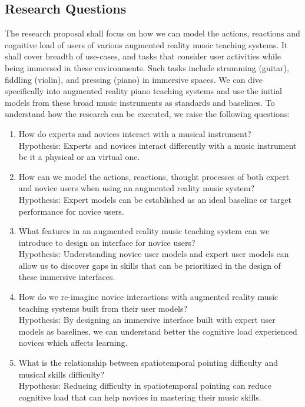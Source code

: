 \documentclass{article}
\begin{document}
\subsection{Research Questions}
The research proposal shall focus on how we can model the actions, reactions and cognitive load of users of various augmented reality music teaching systems. It shall cover breadth of use-cases, and tasks that consider user activities while being immersed in these environments. Such tasks include strumming (guitar), fiddling (violin), and pressing (piano) in immersive spaces. We can dive specifically into augmented reality piano teaching systems  and use the initial models from these broad music instruments as standards and baselines. To understand how the research can be executed, we raise the following questions: 
\begin{enumerate}
    \item How do experts and novices interact with a musical instrument?\\
    Hypothesis: Experts and novices interact differently with a music instrument be it a physical or an virtual one. 
    \item How can we model the actions, reactions, thought processes of both expert and novice users when using an augmented reality music system?\\
    Hypothesis: Expert models can be established as an ideal baseline or target performance for novice users. 
    \item What features in an augmented reality music teaching system can we introduce to design an interface for novice users?\\
    Hypothesis: Understanding novice user models and expert user models can allow us to discover gaps in skills that can be prioritized in the design of these immersive interfaces. 
    \item How do we re-imagine novice interactions with augmented reality music teaching systems built from their user models?\\
    Hypothesis: By designing an immersive interface built with expert user models as baselines, we can understand better the cognitive load experienced novices which affects learning. 
    \item What is the relationship between spatiotemporal pointing difficulty and musical skills difficulty?\\
    Hypothesis: Reducing difficulty in spatiotemporal pointing can reduce cognitive load that can help novices in mastering their music skills. 
\end{enumerate}
\end{document}
